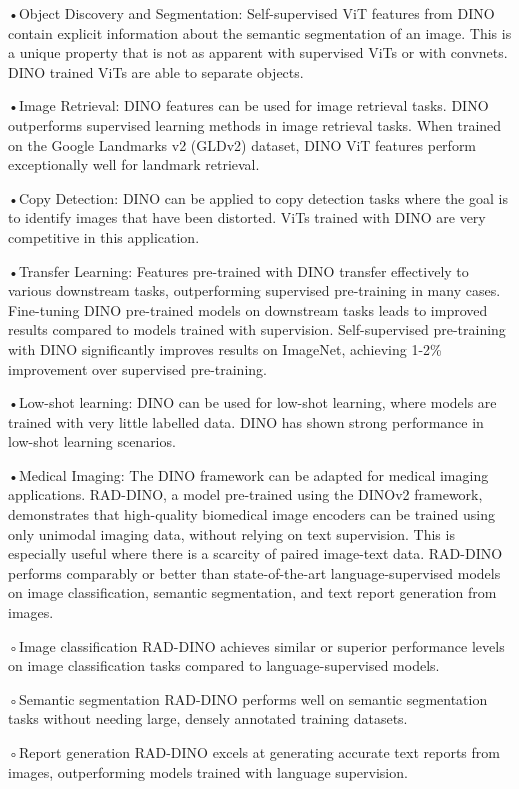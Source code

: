 \documentclass[
]{book}
\begin{document}
•Object Discovery and Segmentation: Self-supervised ViT features from DINO contain explicit information about the semantic segmentation of an image. This is a unique property that is not as apparent with supervised ViTs or with convnets. DINO trained ViTs are able to separate objects.

•Image Retrieval: DINO features can be used for image retrieval tasks. DINO outperforms supervised learning methods in image retrieval tasks. When trained on the Google Landmarks v2 (GLDv2) dataset, DINO ViT features perform exceptionally well for landmark retrieval.

•Copy Detection: DINO can be applied to copy detection tasks where the goal is to identify images that have been distorted. ViTs trained with DINO are very competitive in this application.

•Transfer Learning: Features pre-trained with DINO transfer effectively to various downstream tasks, outperforming supervised pre-training in many cases. Fine-tuning DINO pre-trained models on downstream tasks leads to improved results compared to models trained with supervision. Self-supervised pre-training with DINO significantly improves results on ImageNet, achieving 1-2\% improvement over supervised pre-training.

•Low-shot learning: DINO can be used for low-shot learning, where models are trained with very little labelled data. DINO has shown strong performance in low-shot learning scenarios.

•Medical Imaging: The DINO framework can be adapted for medical imaging applications. RAD-DINO, a model pre-trained using the DINOv2 framework, demonstrates that high-quality biomedical image encoders can be trained using only unimodal imaging data, without relying on text supervision. This is especially useful where there is a scarcity of paired image-text data. RAD-DINO performs comparably or better than state-of-the-art language-supervised models on image classification, semantic segmentation, and text report generation from images.

◦Image classification RAD-DINO achieves similar or superior performance levels on image classification tasks compared to language-supervised models.

◦Semantic segmentation RAD-DINO performs well on semantic segmentation tasks without needing large, densely annotated training datasets.

◦Report generation RAD-DINO excels at generating accurate text reports from images, outperforming models trained with language supervision.
\end{document}
